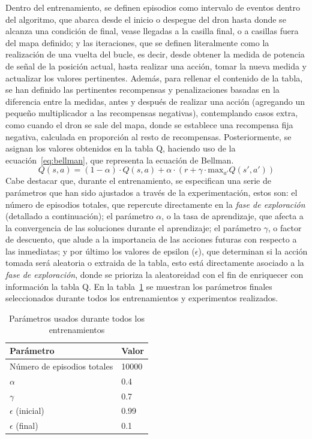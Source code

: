 Dentro del entrenamiento, se definen episodios como intervalo de eventos dentro del algoritmo, que abarca desde el inicio o despegue del dron hasta donde se alcanza una condición de final, vease llegadas a la casilla final, o a casillas fuera del mapa definido; y las iteraciones, que se definen literalmente como la realización de una vuelta del bucle, es decir, desde obtener la medida de potencia de señal de la posición actual, hasta realizar una acción, tomar la nueva medida y actualizar los valores pertinentes. Además, para rellenar el contenido de la tabla, se han definido las pertinentes recompensas y penalizaciones basadas en la diferencia entre la medidas, antes y después de realizar una acción (agregando un pequeño multiplicador a las recompensas negativas), contemplando casos extra, como cuando el dron se sale del mapa, donde se establece una recompensa fija negativa, calculada en proporción al resto de recompensas. Posteriormente, se asignan los valores obtenidos en la tabla Q, haciendo uso de la ecuación~\ref{eq:bellman}, que representa la ecuación de Bellman.
\begin{equation}
    Q(s, a) = (1 - \alpha) \cdot Q(s, a) + \alpha \cdot \left(r + \gamma \cdot \mathrm{max}_{a'} Q(s', a')\right)
    \label{eq:bellman}
\end{equation}
Cabe destacar que, durante el entrenamiento, se especifican una serie de parámetros que han sido ajustados a través de la experimentación, estos son: el número de episodios totales, que repercute directamente en la \emph{fase de exploración} (detallado a continuación); el parámetro $\alpha$, o la tasa de aprendizaje, que afecta a la convergencia de las soluciones durante el aprendizaje; el parámetro $\gamma$, o factor de descuento, que alude a la importancia de las acciones futuras con respecto a las inmediatas; y por último los valores de epsilon ($\epsilon$), que determinan si la acción tomada será aleatoria o extraida de la tabla, esto está directamente asociado a la \emph{fase de exploración}, donde se prioriza la aleatoreidad con el fin de enriquecer con información la tabla Q. En la tabla~\ref{table:params} se muestran los parámetros finales seleccionados durante todos los entrenamientos y experimentos realizados.\\

\begin{table} [t]
    \centering
    \begin{tabular}{|l|l|}
    \hline
    Parámetro                       & Valor \\
    \hline
    Número de episodios totales     & 10000 \\
    $\alpha$                        & 0.4   \\
    $\gamma$                        & 0.7   \\
    $\epsilon$ (inicial)            & 0.99  \\
    $\epsilon$ (final)              & 0.1   \\
    \hline
    \end{tabular}
    \caption[Parámetros usados durante todos los entrenamientos]{Parámetros usados durante todos los entrenamientos}
    \label{table:params}
\end{table}

